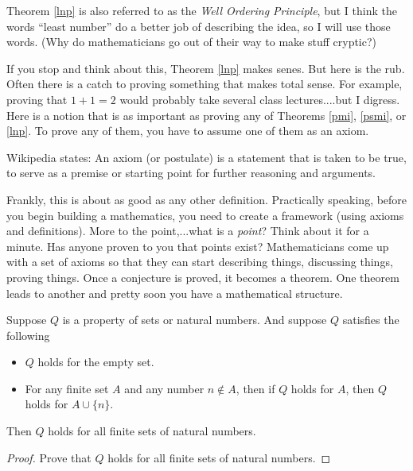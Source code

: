 Theorem \ref{lnp} is also referred to as the \emph{Well Ordering Principle}, but I think the words ``least number'' do a better job of describing the idea, so I will use those words. (Why do mathematicians go out of their way to make stuff cryptic?) 


If you stop and think about this, Theorem \ref{lnp} makes senes.  But here is the rub.  Often there is a catch to proving something that makes total sense.  For example, proving that $1+1 = 2$ would probably take several class lectures....but I digress.  Here is a notion that is as important as proving any of Theorems \ref{pmi}, \ref{psmi}, or \ref{lnp}.  To prove any of them, you have to assume one of them as an axiom.
\begin{definition}[Axiom]
Wikipedia states: An axiom (or postulate) is a statement that is taken to be true, to serve as a premise or starting point for further reasoning and arguments. 
\end{definition}
\begin{remark}
Frankly, this is about as good as any other definition.  Practically speaking, before you begin building a mathematics, you need to create a framework (using axioms and definitions).  More to the point,...what is a \emph{point}?  Think about it for a minute.  Has anyone proven to you that points exist?  Mathematicians come up with a set of axioms so that they can start describing things, discussing things, proving things.  Once a conjecture is proved, it becomes a theorem.  One theorem leads to another and pretty soon you have a mathematical structure.  
\end{remark}

\newpage
\begin{problem}
Suppose $Q$ is a property of sets or natural numbers.  And suppose $Q$ satisfies the following
\begin{itemize}
\item $Q$ holds for the empty set.
\item For any finite set $A$ and any number $n\not\in A$, then if $Q$ holds for $A$, then $Q$ holds for $A\cup \{n\}$.
\end{itemize}
Then $Q$ holds for all finite sets of natural numbers.

\begin{proof}Prove that $Q$ holds for all finite sets of natural numbers.
\end{proof}
\end{problem}


